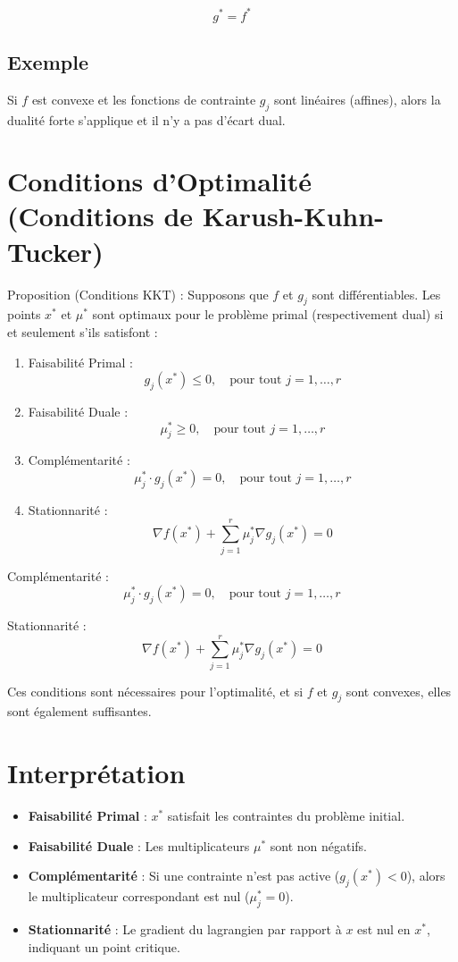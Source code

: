 \documentclass{article}
\begin{document}
\[
g^* = f^*
\]

\subsection{Exemple}

Si $f$ est convexe et les fonctions de contrainte $g_j$ sont linéaires (affines), alors la dualité forte s'applique et il n'y a pas d'écart dual.

\section{Conditions d'Optimalité (Conditions de Karush-Kuhn-Tucker)}

Proposition (Conditions KKT) : Supposons que $f$ et $g_j$ sont différentiables. Les points $x^*$ et $\mu^*$ sont optimaux pour le problème primal (respectivement dual) si et seulement s'ils satisfont :

\begin{enumerate}
    \item Faisabilité Primal : 
    \[
    g_j(x^*) \leq 0, \quad \text{pour tout } j = 1, \dotsc, r
    \]
    \item Faisabilité Duale : 
    \[
    \mu_j^* \geq 0, \quad \text{pour tout } j = 1, \dotsc, r
    \]
    \item Complémentarité :
    \[
    \mu_j^* \cdot g_j(x^*) = 0, \quad \text{pour tout } j = 1, \dotsc, r
    \]
    \item Stationnarité : 
    \[
    \nabla f(x^*) + \sum_{j=1}^r \mu_j^* \nabla g_j(x^*) = 0
    \]
\end{enumerate}

\item Complémentarité : 
    \[
    \mu_j^* \cdot g_j(x^*) = 0, \quad \text{pour tout } j = 1, \dotsc, r
    \]
    
\item Stationnarité : 
    \[
    \nabla f(x^*) + \sum_{j=1}^r \mu_j^* \nabla g_j(x^*) = 0
    \]

Ces conditions sont nécessaires pour l'optimalité, et si $f$ et $g_j$ sont convexes, elles sont également suffisantes.

\section{Interprétation}

\begin{itemize}
    \item \textbf{Faisabilité Primal} : $x^*$ satisfait les contraintes du problème initial.
    \item \textbf{Faisabilité Duale} : Les multiplicateurs $\mu^*$ sont non négatifs.
    \item \textbf{Complémentarité} : Si une contrainte n'est pas active ($g_j(x^*) < 0$), alors le multiplicateur correspondant est nul ($\mu_j^* = 0$).
    \item \textbf{Stationnarité} : Le gradient du lagrangien par rapport à $x$ est nul en $x^*$, indiquant un point critique.
\end{itemize}
\end{document}
